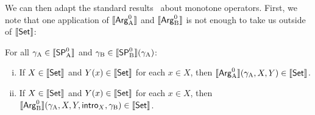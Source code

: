 \documentclass{article}
\begin{document}




We can then adapt the standard results~\cite{aczel1977indDef} about
monotone operators. First, we note that one application of
$\sem{\ArgAp}$ and $\sem{\ArgBp}$ is not enough to take us outside of
$\sem{\Set}$:


\begin{lemma}
  For all $\gammaA \in \sem{\SPAp}$ and $\gammaB \in \sem{\SPBp}(\gammaA)$:
  \begin{enumerate}[(i)]
  \item If $X \in \sem{\Set}$ and $Y(x) \in \sem{\Set}$ for each $x \in X$, then $\sem{\ArgAp}(\gammaA, X, Y) \in \sem{\Set}$.
  \item If $X \in \sem{\Set}$ and $Y(x) \in \sem{\Set}$ for each $x \in X$, then $\sem{\ArgBp}(\gammaA, X, Y, \intro{X}, \gammaB) \in \sem{\Set}$.
  \end{enumerate}
  \end{lemma}
\end{document}
